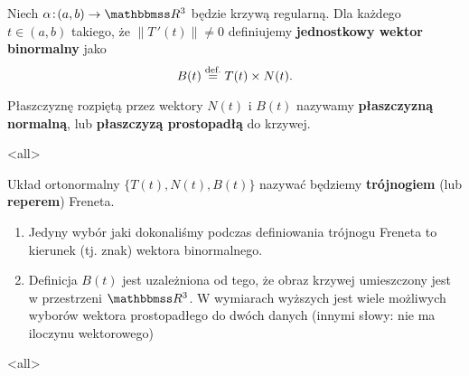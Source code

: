 \begin{frame}

\begin{definicja}
Niech $\alpha\colon (a,b)\to \R^3$ będzie krzywą regularną. Dla każdego $t\in (a,b)$ takiego, że $\|T\,'(t)\|\neq 0$ definiujemy \textbf{jednostkowy wektor binormalny} jako \[B(t)\define T(t)\times N(t).\]

\pause Płaszczyznę rozpiętą przez wektory $N(t)$ i $B(t)$ nazywamy \textbf{płaszczyzną normalną}, lub \textbf{płaszczyzą prostopadłą} do krzywej.
\end{definicja}


\end{frame}
\mode<all>{}
\begin{frame}[<+->]

\begin{definicja}
Układ ortonormalny $\{T(t),N(t),B(t)\}$ nazywać będziemy \textbf{trójnogiem} (lub \textbf{reperem}) Freneta.
\end{definicja}

\begin{center}
\begin{tikzpicture}[y=0.80pt, x=0.8pt,scale=0.5,yscale=-1, inner sep=0pt, outer sep=0pt]

\end{tikzpicture}
\end{center}


\end{frame}
\begin{frame}[<+->]

\begin{uwaga}
\begin{enumerate}
\item Jedyny wybór jaki dokonaliśmy podczas definiowania trójnogu Freneta to kierunek (tj. znak) wektora binormalnego.
\item Definicja $B(t)$ jest uzależniona od tego, że obraz krzywej umieszczony jest w przestrzeni $\R^3$. W wymiarach wyższych jest wiele możliwych wyborów wektora prostopadłego do dwóch danych (innymi słowy: nie ma iloczynu wektorowego)
\end{enumerate}
\end{uwaga}


\end{frame}
\mode<all> 
